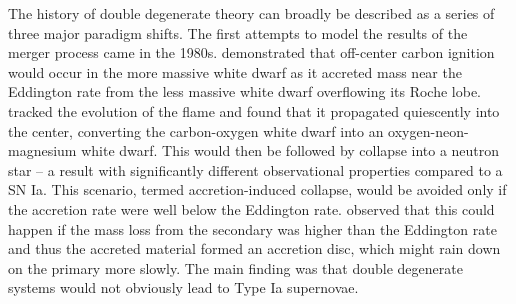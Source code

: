 \documentclass{emulateapj}
\begin{document}
The history of double degenerate theory can broadly be described as a
series of three major paradigm shifts. The first attempts to model the
results of the merger process came in the
1980s. \cite{nomotoiben:1985} demonstrated that off-center carbon
ignition would occur in the more massive white dwarf as it accreted
mass near the Eddington rate from the less massive white dwarf
overflowing its Roche lobe. \cite{saionomoto:1985} tracked the
evolution of the flame and found that it propagated quiescently into
the center, converting the carbon-oxygen white dwarf into an
oxygen-neon-magnesium white dwarf. This would then be followed by
collapse into a neutron star -- a result with significantly different
observational properties compared to a SN Ia. This scenario, termed
accretion-induced collapse, would be avoided only if the accretion
rate were well below the Eddington rate. \cite{tutukov_yungelson:1979}
observed that this could happen if the mass loss from the secondary
was higher than the Eddington rate and thus the accreted material
formed an accretion disc, which might rain down on the primary more
slowly. The main finding was that double degenerate systems would not
obviously lead to Type Ia supernovae.
\end{document}
